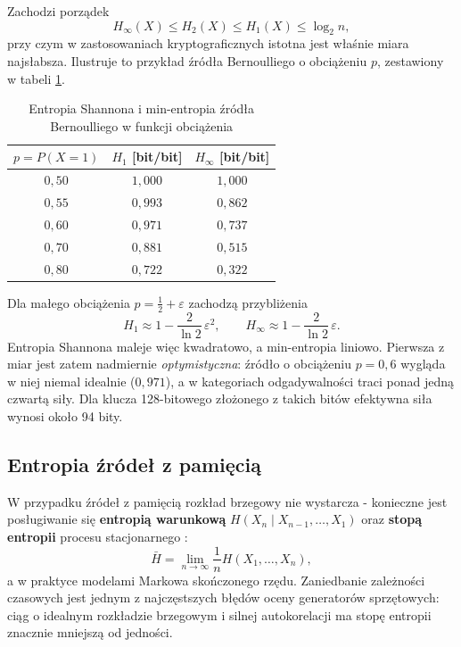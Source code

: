 Zachodzi porządek
%
\begin{equation}
  H_\infty(X) \le H_2(X) \le H_1(X) \le \log_2 n ,
  \label{eq:porzadek}
\end{equation}
%
przy czym w zastosowaniach kryptograficznych istotna jest właśnie miara
najsłabsza. Ilustruje to przykład źródła Bernoulliego o obciążeniu $p$,
zestawiony w tabeli \ref{tab:entropia-obciazenie}.

\begin{table}[htbp]
  \centering
  \caption{Entropia Shannona i min-entropia źródła Bernoulliego
           w funkcji obciążenia}
  \label{tab:entropia-obciazenie}
  \begin{tabular}{ccc}
    \hline
    $p = P(X = 1)$ & $H_1$ [bit/bit] & $H_\infty$ [bit/bit] \\
    \hline
    $0{,}50$ & $1{,}000$ & $1{,}000$ \\
    $0{,}55$ & $0{,}993$ & $0{,}862$ \\
    $0{,}60$ & $0{,}971$ & $0{,}737$ \\
    $0{,}70$ & $0{,}881$ & $0{,}515$ \\
    $0{,}80$ & $0{,}722$ & $0{,}322$ \\
    \hline
  \end{tabular}
\end{table}

Dla małego obciążenia $p = \tfrac{1}{2} + \varepsilon$ zachodzą przybliżenia
%
\begin{equation}
  H_1 \approx 1 - \frac{2}{\ln 2}\,\varepsilon^2 ,
  \qquad
  H_\infty \approx 1 - \frac{2}{\ln 2}\,\varepsilon .
  \label{eq:przyblizenia}
\end{equation}
%
Entropia Shannona maleje więc kwadratowo, a min-entropia liniowo. Pierwsza
z miar jest zatem nadmiernie \emph{optymistyczna}: źródło o obciążeniu
$p = 0{,}6$ wygląda w niej niemal idealnie ($0{,}971$), a w kategoriach
odgadywalności traci ponad jedną czwartą siły. Dla klucza 128-bitowego
złożonego z takich bitów efektywna siła wynosi około 94 bity.

\subsection{Entropia źródeł z pamięcią}

W przypadku źródeł z pamięcią rozkład brzegowy nie wystarcza - konieczne
jest posługiwanie się \textbf{entropią warunkową}
$H(X_n \mid X_{n-1},\dots,X_1)$ oraz \textbf{stopą entropii} procesu
stacjonarnego \cite{cover2006elements}:
%
\begin{equation}
  \bar{H} = \lim_{n \to \infty} \frac{1}{n} H(X_1,\dots,X_n),
  \label{eq:stopa-entropii}
\end{equation}
%
a w praktyce modelami Markowa skończonego rzędu. Zaniedbanie zależności
czasowych jest jednym z najczęstszych błędów oceny generatorów sprzętowych:
ciąg o idealnym rozkładzie brzegowym i silnej autokorelacji ma stopę entropii
znacznie mniejszą od jedności.

